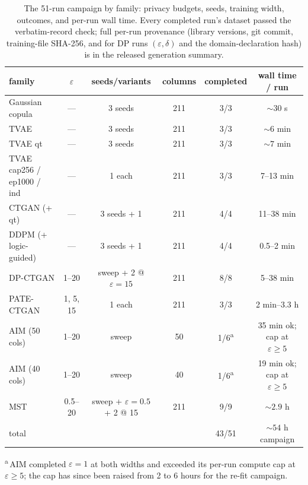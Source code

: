 \documentclass[11pt,a4paper]{article}
\newcommand{\eps}{\ensuremath{\varepsilon}}
\begin{document}
\begin{table}[htbp]
\centering
\small
\caption{The 51-run campaign by family: privacy budgets, seeds, training width,
outcomes, and per-run wall time. Every completed run's dataset passed the
verbatim-record check; full per-run provenance (library versions, git commit,
training-file SHA-256, and for DP runs $(\eps, \delta)$ and the domain-declaration
hash) is in the released generation summary.}
\label{tab:runs}
\begin{tabular}{lccccc}
\toprule
family & \eps & seeds/variants & columns & completed & wall time / run \\
\midrule
Gaussian copula & --- & 3 seeds & 211 & 3/3 & ${\sim}30$ s \\
TVAE & --- & 3 seeds & 211 & 3/3 & ${\sim}6$ min \\
TVAE qt & --- & 3 seeds & 211 & 3/3 & ${\sim}7$ min \\
TVAE cap256 / ep1000 / ind & --- & 1 each & 211 & 3/3 & 7--13 min \\
CTGAN (+ qt) & --- & 3 seeds + 1 & 211 & 4/4 & 11--38 min \\
DDPM (+ logic-guided) & --- & 3 seeds + 1 & 211 & 4/4 & 0.5--2 min \\
DP-CTGAN & 1--20 & sweep + 2 @ $\eps{=}15$ & 211 & 8/8 & 5--38 min \\
PATE-CTGAN & 1, 5, 15 & 1 each & 211 & 3/3 & 2 min--3.3 h \\
AIM (50 cols) & 1--20 & sweep & 50 & 1/6\textsuperscript{a} & 35 min ok; cap at $\eps \geq 5$ \\
AIM (40 cols) & 1--20 & sweep & 40 & 1/6\textsuperscript{a} & 19 min ok; cap at $\eps \geq 5$ \\
MST & 0.5--20 & sweep + $\eps{=}0.5$ + 2 @ 15 & 211 & 9/9 & ${\sim}2.9$ h \\
\midrule
total & & & & 43/51 & ${\sim}54$ h campaign \\
\bottomrule
\end{tabular}

\raggedright\footnotesize \textsuperscript{a}\,AIM completed $\eps = 1$ at both
widths and exceeded its per-run compute cap at $\eps \geq 5$; the cap has since
been raised from 2 to 6 hours for the re-fit campaign.
\end{table}



\end{document}
